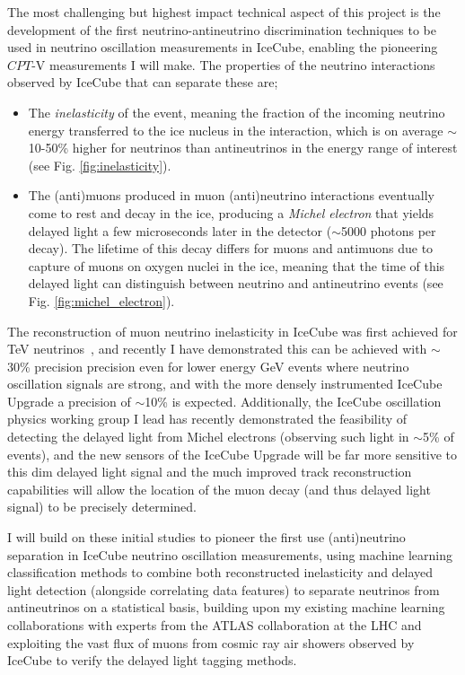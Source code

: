\documentclass[a4paper,11pt]{article}
\begin{document}
The most challenging but highest impact technical aspect of this project is the development of the first neutrino-antineutrino discrimination techniques to be used in neutrino oscillation measurements in IceCube, enabling the pioneering $CPT$-V measurements I will make. The properties of the neutrino interactions observed by IceCube that can separate these are;

\begin{itemize}
    \item The \textit{inelasticity} of the event, meaning the fraction of the incoming neutrino energy transferred to the ice nucleus in the interaction, which is on average $\sim$10-50\%  higher for neutrinos than antineutrinos in the energy range of interest (see Fig. \ref{fig:inelasticity}).
    \item The (anti)muons produced in muon (anti)neutrino interactions eventually come to rest and decay in the ice, producing a \textit{Michel electron} that yields delayed light a few microseconds later in the detector ($\sim$5000 photons per decay). The lifetime of this decay differs for muons and antimuons due to capture of muons on oxygen nuclei in the ice, meaning that the time of this delayed light can distinguish between neutrino and antineutrino events (see Fig. \ref{fig:michel_electron}). 
\end{itemize}

The reconstruction of muon neutrino inelasticity in IceCube was first achieved for TeV neutrinos~\cite{Aartsen:2018vez}, and recently I have demonstrated this can be achieved with $\sim$30\% precision precision even for lower energy GeV events where neutrino oscillation signals are strong, and with the more densely instrumented IceCube Upgrade a precision of $\sim$10\% is expected. Additionally, the IceCube oscillation physics working group I lead has recently demonstrated the feasibility of detecting the delayed light from Michel electrons (observing such light in $\sim$5\% of events), and the new sensors of the IceCube Upgrade will be far more sensitive to this dim delayed light signal and the much improved track reconstruction capabilities will allow the location of the muon decay (and thus delayed light signal) to be precisely determined. 

I will build on these initial studies to pioneer the first use (anti)neutrino separation in IceCube neutrino oscillation measurements, using machine learning classification methods to combine both reconstructed inelasticity and delayed light detection (alongside correlating data features) to separate neutrinos from antineutrinos on a statistical basis, building upon my existing machine learning collaborations with experts from the ATLAS collaboration at the LHC and exploiting the vast flux of muons from cosmic ray air showers observed by IceCube to verify the delayed light tagging methods.
\end{document}
